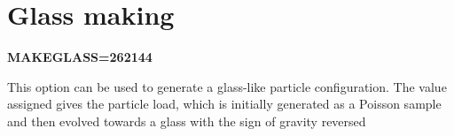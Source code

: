 \par
 \hypertarget{Gadget-Makefile_secmake9}{}\section{Glass making}\label{Gadget-Makefile_secmake9}

\begin{DoxyItemize}
\item {\bfseries MAKEGLASS=262144} \par
 This option can be used to generate a glass-\/like particle configuration. The value assigned gives the particle load, which is initially generated as a Poisson sample and then evolved towards a glass with the sign of gravity reversed 
\end{DoxyItemize}